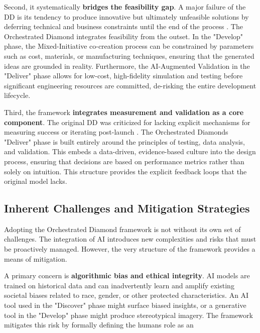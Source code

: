 \documentclass[
  12pt,
  a4paper,
  bibliography=totoc,
  numbers=noenddot
]{scrartcl}
\begin{document}
Second, it systematically \textbf{bridges the feasibility gap}. A major
failure of the DD is its tendency to produce innovative but ultimately
unfeasible solutions by deferring technical and business constraints
until the end of the process \cite{reddit2025double}. The Orchestrated
Diamond integrates feasibility from the outset. In the "Develop" phase,
the Mixed-Initiative co-creation process can be constrained by
parameters such as cost, materials, or manufacturing techniques,
ensuring that the generated ideas are grounded in
reality.\cite{researchgate2025impact} Furthermore, the AI-Augmented Validation in
the "Deliver" phase allows for low-cost, high-fidelity simulation and
testing before significant engineering resources are committed,
de-risking the entire development lifecycle.\cite{logrocket2025designers}

Third, the framework \textbf{integrates measurement and validation as a
core component}. The original DD was criticized for lacking explicit
mechanisms for measuring success or iterating
post-launch \cite{medium2025double}. The Orchestrated
Diamond\textquotesingle s "Deliver" phase is built entirely around the
principles of testing, data analysis, and validation. This embeds a
data-driven, evidence-based culture into the design process, ensuring
that decisions are based on performance metrics rather than solely on
intuition. This structure provides the explicit feedback loops that the
original model lacks.\cite{ideou2025intersection}

\subsection{Inherent Challenges and
Mitigation
Strategies}\label{inherent-challenges-and-mitigation-strategies}

Adopting the Orchestrated Diamond framework is not without its own set
of challenges. The integration of AI introduces new complexities and
risks that must be proactively managed. However, the very structure of
the framework provides a means of mitigation.

A primary concern is \textbf{algorithmic bias and ethical integrity}. AI
models are trained on historical data and can inadvertently learn and
amplify existing societal biases related to race, gender, or other
protected characteristics.\cite{smythos2025exploring} An AI tool used in the
"Discover" phase might surface biased insights, or a generative tool in
the "Develop" phase might produce stereotypical imagery. The framework
mitigates this risk by formally defining the human\textquotesingle s
role as an
\end{document}
